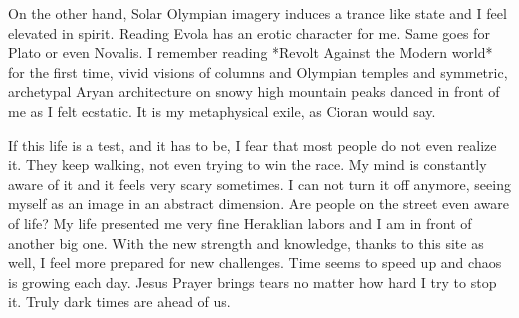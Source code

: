 \begin{footnotesize}
\begin{sffamily}
On the other hand, Solar Olympian imagery induces a trance like state and I feel elevated in spirit. Reading Evola has an erotic character for me. Same goes for Plato or even Novalis. I remember reading *Revolt Against the Modern world* for the first time, vivid visions of columns and Olympian temples and symmetric, archetypal Aryan architecture on snowy high mountain peaks danced in front of me as I felt ecstatic. It is my metaphysical exile, as Cioran would say.

If this life is a test, and it has to be, I fear that most people do not even realize it. They keep walking, not even trying to win the race. My mind is constantly aware of it and it feels very scary sometimes. I can not turn it off anymore, seeing myself as an image in an abstract dimension. Are people on the street even aware of life? My life presented me very fine Heraklian labors and I am in front of another big one. With the new strength and knowledge, thanks to this site as well, I feel more prepared for new challenges. Time seems to speed up and chaos is growing each day. Jesus Prayer brings tears no matter how hard I try to stop it. Truly dark times are ahead of us.


\hfill

\end{sffamily}
\end{footnotesize}

